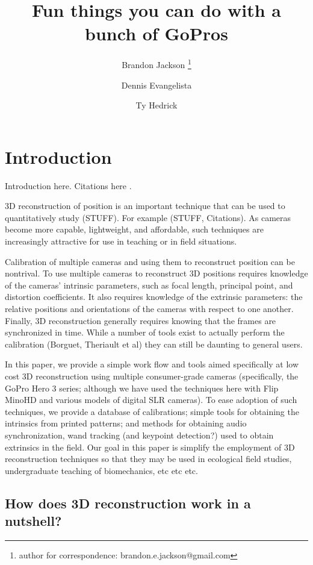 \documentclass[fleqn,10pt]{wlpeerj}
\title{Fun things you can do with a bunch of GoPros}
\author[1,2]{Brandon Jackson \thanks{author for correspondence: brandon.e.jackson@gmail.com}}
\author[2]{Dennis Evangelista}
\author[2]{Ty Hedrick}
\affil[1]{Longwood College, Charlottesville, VA}
\affil[2]{University of North Carolina at Chapel Hill, NC 27599-3280, USA}
\begin{document}
\flushbottom
\maketitle
\thispagestyle{empty}

\modulolinenumbers[5]
\linenumbers

\section*{Introduction}

Introduction here. Citations here \citep{Theriault:2014, Bradski:2008}. 

3D reconstruction of position is an important technique that can be used to quantitatively study (STUFF).  For example (STUFF, Citations). As cameras become more capable, lightweight, and affordable, such techniques are increasingly attractive for use in teaching or in field situations.  

Calibration of multiple cameras and using them to reconstruct position can be nontrival.  To use multiple cameras to reconstruct 3D positions requires knowledge of the cameras' intrinsic parameters, such as focal length, principal point, and distortion coefficients.  It also requires knowledge of the extrinsic parameters: the relative positions and orientations of the cameras with respect to one another. Finally, 3D reconstruction generally requires knowing that the frames are synchronized in time.  While a number of tools exist to actually perform the calibration (Borguet, Theriault et al) they can still be daunting to general users.

In this paper, we provide a simple work flow and tools aimed specifically at low cost 3D reconstruction using multiple consumer-grade cameras (specifically, the GoPro Hero 3 series; although we have used the techniques here with Flip MinoHD and various models of digital SLR cameras).  To ease adoption of such techniques, we provide a database of calibrations; simple tools for obtaining the intrinsics from printed patterns; and methods for obtaining audio synchronization, wand tracking (and keypoint detection?) used to obtain extrinsics in the field. Our goal in this paper is simplify the employment of 3D reconstruction techniques so that they may be used in ecological field studies, undergraduate teaching of biomechanics, etc etc etc. 

\subsection*{How does 3D reconstruction work in a nutshell?}
\end{document}
